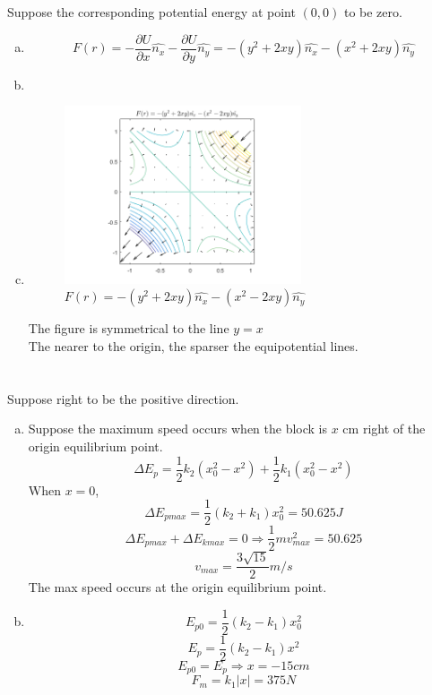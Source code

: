 \documentclass{article}
\begin{document}
\section{}
	Suppose the corresponding potential energy at point $(0,0)$ to be zero.
\begin{enumerate}[(a)]
	\item
	$$F(r)=-\frac{\partial U}{\partial x}\hat{n_x}-\frac{\partial U}{\partial y}\hat{n_y}=-(y^2+2xy)\hat{n_x}-(x^2+2xy)\hat{n_y}$$
	\item
	\item
	\begin{figure}[h!]
		\centering
		\includegraphics[width=7cm]{p3_a.png}
		\caption{$F(r)=-(y^2+2xy)\hat{n_x}-(x^2-2xy)\hat{n_y}$}
		\label{fig-2-a}
	\end{figure}
	The figure is symmetrical to the line $y=x$\\
	The nearer to the origin, the sparser the equipotential lines.
\end{enumerate}

\section{}
	Suppose right to be the positive direction.
\begin{enumerate}[(a)]
	\item
	Suppose the maximum speed occurs when the block is $x$ cm right of the origin equilibrium point.
	$$\Delta E_p=\frac{1}{2}k_2(x_0^2-x^2)+\frac{1}{2}k_1(x_0^2-x^2)$$
	When $x=0$,
	$$\Delta E_{pmax}=\frac{1}{2}(k_2+k_1)x_0^2=50.625J$$
	$$\Delta E_{pmax}+\Delta E_{kmax}=0\Longrightarrow\frac{1}{2}mv_{max}^2=50.625$$
	$$v_{max}=\frac{3\sqrt{15}}{2}m/s$$
	The max speed occurs at the origin equilibrium point.
	\item
	$$E_{p0}=\frac{1}{2}(k_2-k_1)x_0^2$$
	$$E_{p}=\frac{1}{2}(k_2-k_1)x^2$$
	$$E_{p0}=E_p\Longrightarrow x=-15cm$$
	$$F_m=k_1|x|=375N$$

\end{enumerate}
\end{document}
